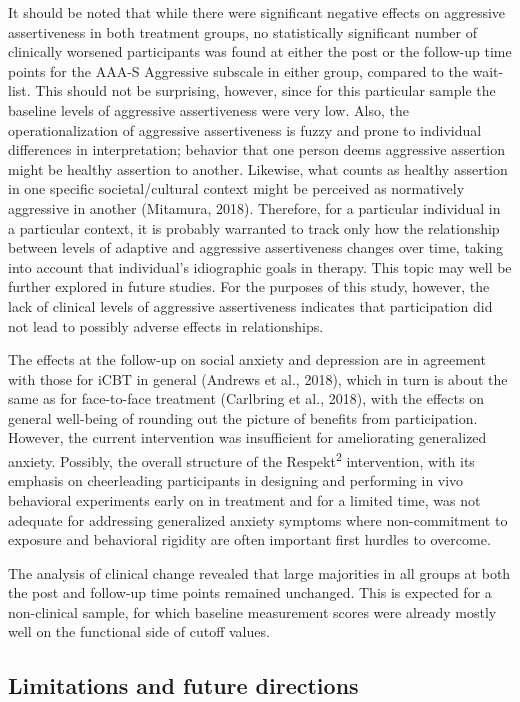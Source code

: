 \documentclass[3p]{elsarticle} %
\begin{document}
It should be noted that while there were significant negative effects on
aggressive assertiveness in both treatment groups, no statistically
significant number of clinically worsened participants was found at
either the post or the follow-up time points for the AAA-S Aggressive
subscale in either group, compared to the wait-list. This should not be
surprising, however, since for this particular sample the baseline
levels of aggressive assertiveness were very low. Also, the
operationalization of aggressive assertiveness is fuzzy and prone to
individual differences in interpretation; behavior that one person deems
aggressive assertion might be healthy assertion to another. Likewise,
what counts as healthy assertion in one specific societal/cultural
context might be perceived as normatively aggressive in another
(Mitamura, 2018). Therefore, for a particular individual in a particular
context, it is probably warranted to track only how the relationship
between levels of adaptive and aggressive assertiveness changes over
time, taking into account that individual's idiographic goals in
therapy. This topic may well be further explored in future studies. For
the purposes of this study, however, the lack of clinical levels of
aggressive assertiveness indicates that participation did not lead to
possibly adverse effects in relationships.

The effects at the follow-up on social anxiety and depression are in
agreement with those for iCBT in general (Andrews et al., 2018), which
in turn is about the same as for face-to-face treatment (Carlbring et
al., 2018), with the effects on general well-being of rounding out the
picture of benefits from participation. However, the current
intervention was insufficient for ameliorating generalized anxiety.
Possibly, the overall structure of the Respekt\textsuperscript{2}
intervention, with its emphasis on cheerleading participants in
designing and performing in vivo behavioral experiments early on in
treatment and for a limited time, was not adequate for addressing
generalized anxiety symptoms where non-commitment to exposure and
behavioral rigidity are often important first hurdles to overcome.

The analysis of clinical change revealed that large majorities in all
groups at both the post and follow-up time points remained unchanged.
This is expected for a non-clinical sample, for which baseline
measurement scores were already mostly well on the functional side of
cutoff values.

\hypertarget{limitations-and-future-directions}{%
\subsection{Limitations and future
directions}\label{limitations-and-future-directions}}
\end{document}
